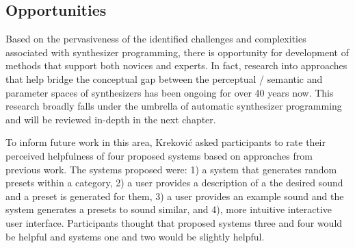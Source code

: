 

\subsection{Opportunities}
Based on the pervasiveness of the identified challenges and complexities associated with synthesizer programming, there is opportunity for development of methods that support both novices and experts. In fact, research into approaches that help bridge the conceptual gap between the perceptual / semantic and parameter spaces of synthesizers has been ongoing for over 40 years now. This research broadly falls under the umbrella of automatic synthesizer programming and will be reviewed in-depth in the next chapter.

To inform future work in this area, Krekovi\'{c} asked participants to rate their perceived helpfulness of four proposed systems based on approaches from previous work. The systems proposed were: 1) a system that generates random presets within a category, 2) a user provides a description of a the desired sound and a preset is generated for them, 3) a user provides an example sound and the system generates a presets to sound similar, and 4), more intuitive interactive user interface. Participants thought that proposed systems three and four would be helpful and systems one and two would be slightly helpful.

